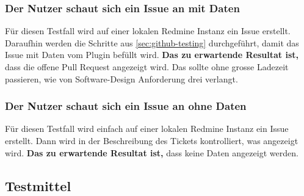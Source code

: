 \begin{minipage}{\textwidth}
  \subsubsection{Der Nutzer schaut sich ein Issue an mit Daten}
  Für diesen Testfall wird auf einer lokalen Redmine Instanz ein Issue erstellt. Daraufhin werden die Schritte aus
  \ref{sec:github-testing} durchgeführt, damit das Issue mit Daten vom Plugin befüllt wird. \newline
  \textbf{Das zu erwartende Resultat ist,} dass die offene Pull Request angezeigt wird. Das sollte ohne grosse Ladezeit passieren, wie von 
  Software-Design Anforderung drei verlangt.
\end{minipage}

\begin{minipage}{\textwidth}
  \subsubsection{Der Nutzer schaut sich ein Issue an ohne Daten}
  Für diesen Testfall wird einfach auf einer lokalen Redmine Instanz ein Issue erstellt. Dann wird in der Beschreibung des Tickets
  kontrolliert, was angezeigt wird. \newline
  \textbf{Das zu erwartende Resultat ist,} dass keine Daten angezeigt werden.
\end{minipage}

\subsection{Testmittel}
